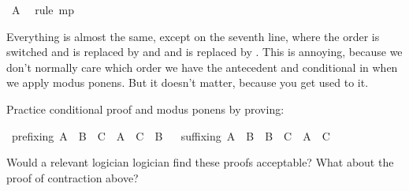 \begin{isabellebody}
\ {\isacharbackquoteopen}A{\isacharbackquoteclose}\ \isamarkupfalse%
\ {\isacharparenleft}rule\ mp{\isacharparenright}\isanewline
\ \ \isamarkupfalse%
\isanewline
{}\isamarkupfalse%
%
\endisatagproof
{\isafoldproof}%
%
\isadelimproof
%
\endisadelimproof
%
\begin{isamarkuptext}%
Everything is almost the same, except on the seventh line, where the order is switched and
 is replaced by  and  and  is replaced by .
This is annoying, because we don't normally care which order we have the antecedent and conditional
in when we apply modus ponens. But it doesn't matter, because you get used to it.%
\end{isamarkuptext}\isamarkuptrue%
%
\begin{isamarkuptext}%
\begin{Exercise} Practice conditional proof and modus ponens by proving: \end{Exercise}%
\end{isamarkuptext}\isamarkuptrue%
\isamarkupfalse%
\ prefixing{\isacharcolon}\ {\isachardoublequoteopen}{\isacharparenleft}A\ {\isasymlongrightarrow}\ B{\isacharparenright}\ {\isasymlongrightarrow}\ {\isacharparenleft}C\ {\isasymlongrightarrow}\ A{\isacharparenright}\ {\isasymlongrightarrow}\ {\isacharparenleft}C\ {\isasymlongrightarrow}\ B{\isacharparenright}{\isachardoublequoteclose}%
\isadelimproof
\ %
\endisadelimproof
%
\isatagproof
{}\isamarkupfalse%
%
\endisatagproof
{\isafoldproof}%
%
\isadelimproof
%
\endisadelimproof
\isanewline
\isanewline
{}\isamarkupfalse%
\ suffixing{\isacharcolon}\ {\isachardoublequoteopen}{\isacharparenleft}A\ {\isasymlongrightarrow}\ B{\isacharparenright}\ {\isasymlongrightarrow}\ {\isacharparenleft}B\ {\isasymlongrightarrow}\ C{\isacharparenright}\ {\isasymlongrightarrow}\ {\isacharparenleft}A\ {\isasymlongrightarrow}\ C{\isacharparenright}{\isachardoublequoteclose}%
\isadelimproof
\ %
\endisadelimproof
%
\isatagproof
{}\isamarkupfalse%
%
\endisatagproof
{\isafoldproof}%
%
\isadelimproof
%
\endisadelimproof
%
\begin{isamarkuptext}%
Would a relevant logician logician find these proofs acceptable? What about the proof of
contraction above?%
\end{isamarkuptext}\isamarkuptrue%
%
\isamarkuptrue%
%
\begin{isamarkuptext}%

\end{isamarkuptext}
\end{isabellebody}
